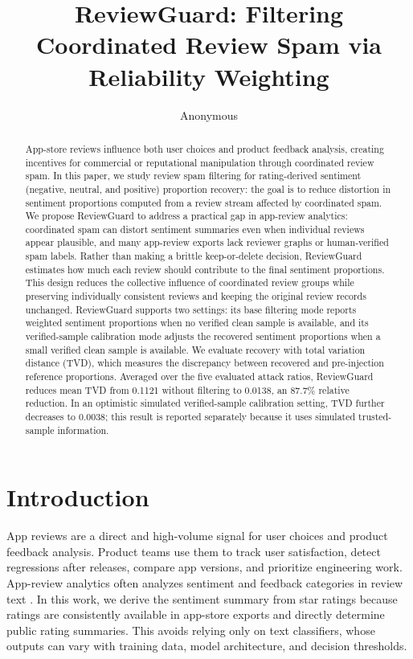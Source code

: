 \documentclass[runningheads]{llncs}
\title{ReviewGuard: Filtering Coordinated Review Spam via Reliability Weighting}
\author{Anonymous}
\institute{Anonymous Institution}
\begin{document}
\maketitle

\begin{abstract}
App-store reviews influence both user choices and product feedback analysis, creating incentives for commercial or reputational manipulation through coordinated review spam. In this paper, we study review spam filtering for rating-derived sentiment (negative, neutral, and positive) proportion recovery: the goal is to reduce distortion in sentiment proportions computed from a review stream affected by coordinated spam. We propose ReviewGuard to address a practical gap in app-review analytics: coordinated spam can distort sentiment summaries even when individual reviews appear plausible, and many app-review exports lack reviewer graphs or human-verified spam labels. Rather than making a brittle keep-or-delete decision, ReviewGuard estimates how much each review should contribute to the final sentiment proportions. This design reduces the collective influence of coordinated review groups while preserving individually consistent reviews and keeping the original review records unchanged. ReviewGuard supports two settings: its base filtering mode reports weighted sentiment proportions when no verified clean sample is available, and its verified-sample calibration mode adjusts the recovered sentiment proportions when a small verified clean sample is available. We evaluate recovery with total variation distance (TVD), which measures the discrepancy between recovered and pre-injection reference proportions. Averaged over the five evaluated attack ratios, ReviewGuard reduces mean TVD from 0.1121 without filtering to 0.0138, an 87.7\% relative reduction. In an optimistic simulated verified-sample calibration setting, TVD further decreases to 0.0038; this result is reported separately because it uses simulated trusted-sample information.
\end{abstract}

\section{Introduction}

App reviews are a direct and high-volume signal for user choices and product feedback analysis. Product teams use them to track user satisfaction, detect regressions after releases, compare app versions, and prioritize engineering work. App-review analytics often analyzes sentiment and feedback categories in review text \cite{guzman2014users,maalej2016automatic}. In this work, we derive the sentiment summary from star ratings because ratings are consistently available in app-store exports and directly determine public rating summaries. This avoids relying only on text classifiers, whose outputs can vary with training data, model architecture, and decision thresholds.
\end{document}
